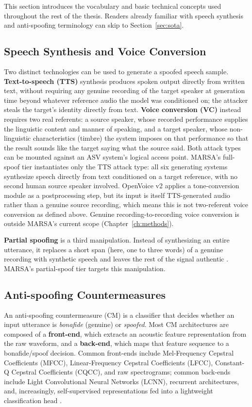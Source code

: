 \documentclass[11pt]{report}
\begin{document}
This section introduces the vocabulary and basic technical concepts used
throughout the rest of the thesis. Readers already familiar with speech
synthesis and anti-spoofing terminology can skip to
Section~\ref{sec:sota}.

\subsection{Speech Synthesis and Voice Conversion}

Two distinct technologies can be used to generate a spoofed speech sample.
\textbf{Text-to-speech (TTS)} synthesis produces spoken output directly
from written text, without requiring any genuine recording of the target
speaker at generation time beyond whatever reference audio the model was
conditioned on; the attacker steals the target's identity directly from
text. \textbf{Voice conversion (VC)} instead requires two real referents:
a source speaker, whose recorded performance supplies the linguistic
content and manner of speaking, and a target speaker, whose
non-linguistic characteristics (timbre) the system imposes on that
performance so that the result sounds like the target saying what the
source said. Both attack types can be mounted against an ASV system's
logical access point. MARSA's full-spoof tier instantiates only the TTS
attack type: all six generating systems synthesize speech directly from
text conditioned on a target reference, with no second human source
speaker involved. OpenVoice v2 applies a tone-conversion module as a
postprocessing step, but its input is itself TTS-generated audio rather
than a genuine source recording, which means this is not two-referent voice
conversion as defined above. Genuine recording-to-recording voice
conversion is outside MARSA's current scope (Chapter~\ref{ch:methods}).

\textbf{Partial spoofing} is a third manipulation. Instead
of synthesizing an entire utterance, it replaces a short span (here, one
to three words) of a genuine recording with synthetic speech
and leaves the rest of the signal authentic \citep{zhang2023partialspoof}.
MARSA's partial-spoof tier targets this manipulation.

\subsection{Anti-spoofing Countermeasures}

An anti-spoofing countermeasure (CM) is a classifier that decides whether
an input utterance is \emph{bonafide} (genuine) or \emph{spoofed}. Most CM
architectures are composed of a \textbf{front-end}, which extracts an
acoustic feature representation from the raw waveform, and a
\textbf{back-end}, which maps that feature sequence to a bonafide/spoof
decision. Common front-ends include Mel-Frequency Cepstral Coefficients
(MFCC), Linear-Frequency Cepstral Coefficients (LFCC), Constant-Q
Cepstral Coefficients (CQCC), and raw spectrograms; common back-ends
include Light Convolutional Neural Networks (LCNN), recurrent
architectures, and, increasingly, self-supervised representations fed
into a lightweight classification head \citep{rawnet2,tak2022ssl,aasist}.
\end{document}
